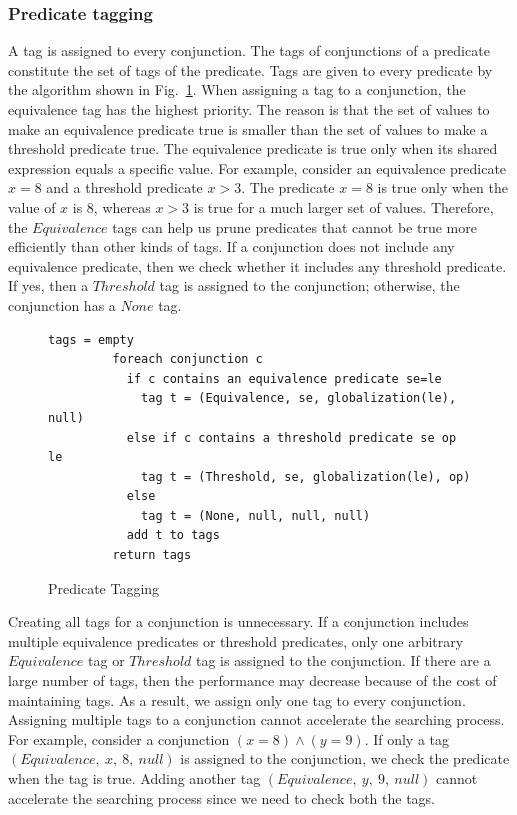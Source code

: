 \documentclass[preprint]{sigplanconf}
\begin{document}
\subsubsection{Predicate tagging}
A tag is assigned to every conjunction. The tags of 
conjunctions of a predicate constitute the set of tags of the predicate. 
Tags are given to every predicate by the algorithm shown in
Fig.~\ref{fig:tagging}. 
When assigning a tag to a conjunction, the equivalence tag has the highest 
priority. The reason is that the set of values to make an equivalence predicate
true is smaller than the set of values to make a threshold predicate true. The equivalence predicate is true 
only when its shared expression equals a specific value. 
For example, consider an equivalence 
predicate $x = 8$ and a threshold predicate $x > 3$. The predicate $x = 8$ is true only when 
the value of $x$ is $8$, whereas $x > 3$ is true for a much larger set of values.
Therefore, the $Equivalence$ tags can help us prune
predicates that cannot be true more efficiently than other kinds of
tags. 
If a conjunction does not 
include any equivalence predicate, then we check whether it 
includes any threshold predicate. If yes, then a $Threshold$ tag is assigned 
to the conjunction; otherwise, the conjunction has a $None$ tag. 

\begin{figure}[ht!]
    \begin{Verbatim}[fontsize=\footnotesize,gobble=8,frame=lines,
            framesep=3mm]
         tags = empty
         foreach conjunction c 
           if c contains an equivalence predicate se=le
             tag t = (Equivalence, se, globalization(le), null)
           else if c contains a threshold predicate se op le
             tag t = (Threshold, se, globalization(le), op)
           else 
             tag t = (None, null, null, null) 
           add t to tags 
         return tags
    \end{Verbatim}
  \caption{Predicate Tagging}
  \label{fig:tagging}
\end{figure}
Creating all tags for a conjunction is unnecessary. If a conjunction includes 
multiple equivalence predicates or threshold predicates, only one arbitrary 
$Equivalence$ tag or $Threshold$ tag is assigned to the conjunction. 
If there are a large number of tags, then the performance may decrease
because of the cost of maintaining tags. As a result, we assign only one tag to
every conjunction.
Assigning multiple tags to a 
conjunction cannot accelerate the searching process. For example, consider a 
conjunction $(x = 8) \wedge (y = 9)$. If only a tag 
$(Equivalence,\ x,\ 8,\ null)$
is assigned to the conjunction, we check the predicate when the tag is
true. Adding another tag $(Equivalence,\ y,\ 9,\ null)$ cannot accelerate the
searching process since we need to check both the tags. 
 
\end{document}
